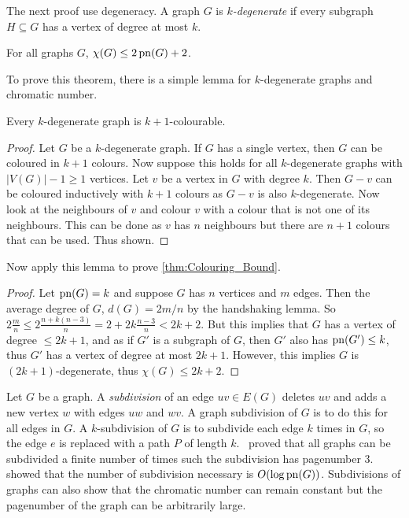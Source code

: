 The next proof use degeneracy. A graph $G$ is \textit{$k$-degenerate} if every subgraph $H \subseteq G$ has a vertex of degree at most $k$. 
\begin{proposition}\label{thm:Colouring_Bound}
	For all graphs \(G\), \(\chi(G) \leq 2 \operatorname{pn}(G) + 2\).
\end{proposition}
To prove this theorem, there is a simple lemma for $k$-degenerate graphs and chromatic number.
\begin{lemma}
	Every $k$-degenerate graph is $k + 1$-colourable.
\end{lemma}
\begin{proof}
	Let $G$ be a $k$-degenerate graph. If $G$ has a single vertex, then $G$ can be coloured in $k + 1$ colours. Now suppose this holds for all $k$-degenerate graphs with $|V(G)|- 1 \geq 1$ vertices. Let $v$ be a vertex in $G$ with degree $k$. Then $G - v$ can be coloured inductively with $k + 1$ colours as $G - v$ is also $k$-degenerate. Now look at the neighbours of $v$ and colour $v$ with a colour that is not one of its neighbours. This can be done as $v$ has $n$ neighbours but there are $n + 1$ colours that can be used. Thus shown. 
\end{proof}
Now apply this lemma to prove \cref{thm:Colouring_Bound}. 
\begin{proof}
	Let \(\operatorname{pn}(G) = k\) and suppose \(G\) has \(n\) vertices and \(m\) edges. Then the average degree of \(G\), \(d(G) = 2m/n\) by the handshaking lemma. So \(2\frac{m}{n} \leq 2 \frac{n + k(n-3)}{n} = 2 + 2k \frac{n-3}{n} < 2k + 2\). But this implies that \(G\) has a vertex of degree \(\leq 2k + 1\), and as if \(G'\) is a subgraph of \(G\), then \(G'\) also has \(\operatorname{pn}(G') \leq k\), thus \(G'\) has a vertex of degree at most \(2k + 1\). However, this implies \(G\) is \((2k + 1)\)-degenerate, thus \(\chi(G) \leq 2k + 2\).
\end{proof}

Let $G$ be a graph. A \textit{subdivision} of an edge $uv \in E(G)$ deletes $uv$ and adds a new vertex $w$ with edges $uw$ and $wv$. A graph subdivision of $G$ is to do this for all edges in $G$. A $k$-subdivision of $G$ is to subdivide each edge $k$ times in $G$, so the edge $e$ is replaced with a path $P$ of length $k$.\ \textcite{atneosenEmbeddabilityCompactaNbooks} proved that all graphs can be subdivided a finite number of times such the subdivision has pagenumber 3.\ \textcite{dujmovicLayoutsGraphSubdivisions2005} showed that the number of subdivision necessary is $O(\log\operatorname{pn}(G))$. Subdivisions of graphs can also show that the chromatic number can remain constant but the pagenumber of the graph can be arbitrarily large.

